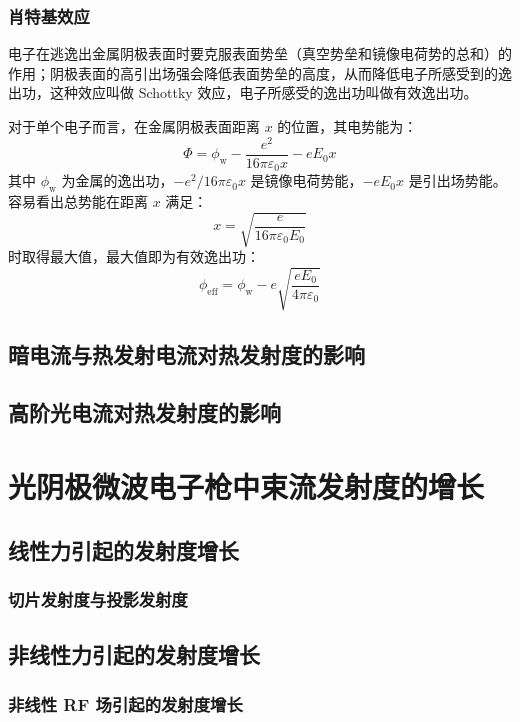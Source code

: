 \subsubsection{肖特基效应}
	电子在逃逸出金属阴极表面时要克服表面势垒（真空势垒和镜像电荷势的总和）的作用；阴极表面的高引出场强会降低表面势垒的高度，从而降低电子所感受到的逸出功，这种效应叫做 Schottky 效应，电子所感受的逸出功叫做有效逸出功。

	对于单个电子而言，在金属阴极表面距离 $x$ 的位置，其电势能为：
	\[
	\Phi = \phi_{\mathrm{w}} - \frac{e^2}{16\pi\varepsilon_0x} - eE_0x
	\]
	其中 $\phi_{\mathrm{w}}$ 为金属的逸出功，$-e^2/16\pi\varepsilon_0x$ 是镜像电荷势能，$- eE_0x$ 是引出场势能。
	容易看出总势能在距离 $x$ 满足：
	\[
	x = \sqrt{\frac{e}{16\pi\varepsilon_0E_0}}
	\]
	时取得最大值，最大值即为有效逸出功：
	\begin{equation}
	\phi_{\mathrm{eff}} = \phi_{\mathrm{w}} - e\sqrt{\frac{eE_0}{4\pi\varepsilon_0}}
	\end{equation}

\subsection{暗电流与热发射电流对热发射度的影响}

\subsection{高阶光电流对热发射度的影响}

\section{光阴极微波电子枪中束流发射度的增长}

\subsection{线性力引起的发射度增长}

\subsubsection{切片发射度与投影发射度}

\subsection{非线性力引起的发射度增长}

\subsubsection{非线性 RF 场引起的发射度增长}

